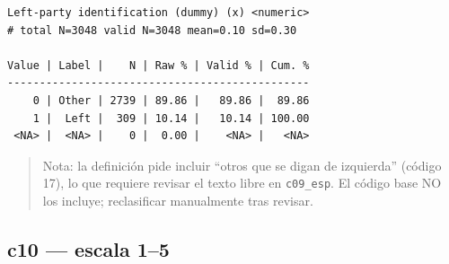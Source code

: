 \documentclass[
  letterpaper,
  DIV=11,
  numbers=noendperiod]{scrreprt}
\newenvironment{Shaded}{\begin{snugshade}}{\end{snugshade}}
\newcommand{\AttributeTok}[1]{\textcolor[rgb]{0.40,0.45,0.13}{#1}}
\newcommand{\CommentTok}[1]{\textcolor[rgb]{0.37,0.37,0.37}{#1}}
\newcommand{\DecValTok}[1]{\textcolor[rgb]{0.68,0.00,0.00}{#1}}
\newcommand{\FunctionTok}[1]{\textcolor[rgb]{0.28,0.35,0.67}{#1}}
\newcommand{\NormalTok}[1]{\textcolor[rgb]{0.00,0.23,0.31}{#1}}
\newcommand{\OtherTok}[1]{\textcolor[rgb]{0.00,0.23,0.31}{#1}}
\newcommand{\SpecialCharTok}[1]{\textcolor[rgb]{0.37,0.37,0.37}{#1}}
\newcommand{\StringTok}[1]{\textcolor[rgb]{0.13,0.47,0.30}{#1}}
\begin{document}
\begin{Shaded}
\end{Shaded}

\begin{verbatim}
Left-party identification (dummy) (x) <numeric> 
# total N=3048 valid N=3048 mean=0.10 sd=0.30

Value | Label |    N | Raw % | Valid % | Cum. %
-----------------------------------------------
    0 | Other | 2739 | 89.86 |   89.86 |  89.86
    1 |  Left |  309 | 10.14 |   10.14 | 100.00
 <NA> |  <NA> |    0 |  0.00 |    <NA> |   <NA>
\end{verbatim}

\begin{quote}
Nota: la definición pide incluir ``otros que se digan de izquierda''
(código 17), lo que requiere revisar el texto libre en
\texttt{c09\_esp}. El código base NO los incluye; reclasificar
manualmente tras revisar.
\end{quote}

\subsection{c10 --- escala 1--5}\label{c10-escala-15}
\end{document}
